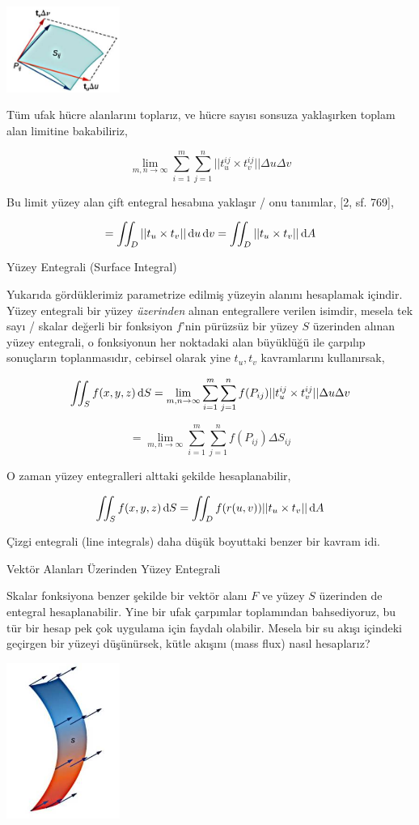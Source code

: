 \documentclass[12pt,fleqn]{article}\usepackage{../../common}
\begin{document}
\includegraphics[width=10em]{calc_multi_75_app_02.jpg}

Tüm ufak hücre alanlarını toplarız, ve hücre sayısı sonsuza yaklaşırken toplam
alan limitine bakabiliriz,

$$
\lim_{m,n \to \infty} \sum_{i=1}^{m} \sum_{j=1}^{n} || t_u^{ij} \times t_v^{ij} || \Delta u \Delta v
$$

Bu limit yüzey alan çift entegral hesabına yaklaşır / onu tanımlar, [2, sf. 769],

$$
= \iint_D || t_u \times t_v || \,\mathrm{d} u \,\mathrm{d} v = \iint_D || t_u \times t_v || \,\mathrm{d} A
$$

Yüzey Entegrali (Surface Integral)

Yukarıda gördüklerimiz parametrize edilmiş yüzeyin alanını hesaplamak içindir.
Yüzey entegrali bir yüzey {\em üzerinden} alınan entegrallere verilen isimdir,
mesela tek sayı / skalar değerli bir fonksiyon $f$'nin pürüzsüz bir yüzey $S$
üzerinden alınan yüzey entegrali, o fonksiyonun her noktadaki alan büyüklüğü ile
çarpılıp sonuçların toplanmasıdır, cebirsel olarak yine $t_u,t_v$ kavramlarını
kullanırsak,

$$
\iint_S f(x,y,z) \,\mathrm{d} S 
= \lim_{m,n \to \infty} \sum_{i=1}^{m} \sum_{j=1}^{n} f(P_{ij}) || t_u^{ij} \times t_v^{ij} || \Delta u \Delta v
$$

$$
= \lim_{m,n \to \infty} \sum_{i=1}^{m} \sum_{j=1}^{n} f(P_{ij}) \Delta S_{ij} 
$$

O zaman yüzey entegralleri alttaki şekilde hesaplanabilir,

$$
\iint_S f(x,y,z) \,\mathrm{d} S =
\iint_D f(r(u,v)) || t_u \times t_v || \,\mathrm{d} A
$$

Çizgi entegrali (line integrals) daha düşük boyuttaki benzer bir kavram idi.

Vektör Alanları Üzerinden Yüzey Entegrali

Skalar fonksiyona benzer şekilde bir vektör alanı $F$ ve yüzey $S$ üzerinden de
entegral hesaplanabilir. Yine bir ufak çarpımlar toplamından bahsediyoruz, bu
tür bir hesap pek çok uygulama için faydalı olabilir. Mesela bir su akışı
içindeki geçirgen bir yüzeyi düşünürsek, kütle akışını (mass flux) nasıl
hesaplarız? 

\includegraphics[width=10em]{calc_multi_75_app_04.jpg}
\end{document}
